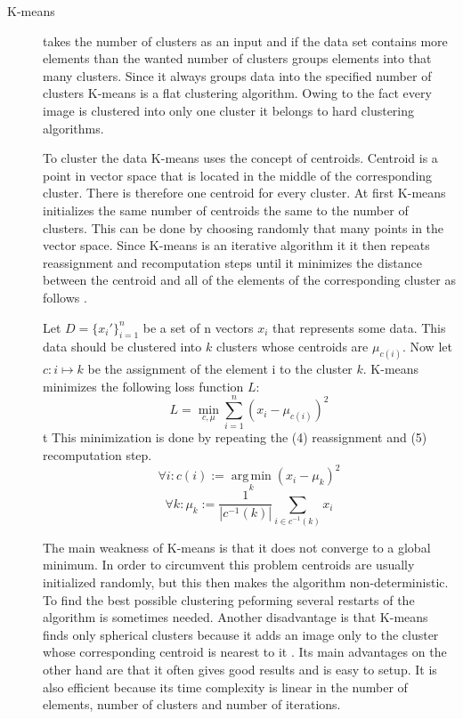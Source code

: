 \documentclass[journal]{vgtc}       %
\begin{document}
\begin{description}
\item [K-means] takes the number of clusters as an input and if the data set contains more elements than the wanted number of clusters groups elements into that many clusters. Since it always groups data into the specified number of clusters K-means is a flat clustering algorithm. Owing to the fact every image is clustered into only one cluster it belongs to hard clustering algorithms. 

To cluster the data K-means uses the concept of centroids. Centroid is a point in vector space that is located in the middle of the corresponding cluster. There is therefore one centroid for every cluster. 
At first K-means initializes the same number of centroids the same to the number of clusters. This can be done by choosing randomly that many points in the vector space. Since K-means is an iterative algorithm it  it then repeats reassignment and recomputation steps until it minimizes the distance between the centroid and all of the elements of the corresponding cluster as follows \cite{KI17}. 

Let $D = \{x_i'\}_{i=1}^n$ be a set of n vectors $x_i$ that represents some data. This data should be clustered into $k$ clusters whose centroids are  $\mu_{c(i)}$. Now let $c: i \mapsto k$ be the assignment of the element i to the cluster $k$. 
K-means minimizes the following loss function $L$:
\begin{equation}
L = \min_{c, \mu} \sum_{i=1}^{n}(x_i - \mu_{c(i)})^2
\end{equation} t
This minimization is done by repeating the (4) reassignment and (5) recomputation step.
\begin{equation}
\forall i: c(i) := \operatorname*{arg\,min}_k (x_i - \mu_k)^2
\end{equation}
\begin{equation}
\forall k: \mu_k := \frac{1}{|c^{-1}(k)|} \sum_{i \in c^{-1}(k)} x_i
\end{equation}


The main weakness of K-means is that it does not converge to a global minimum. In order to circumvent this problem centroids are usually initialized randomly, but this then makes the algorithm non-deterministic. To find the best possible clustering peforming several restarts of the algorithm is sometimes needed.  Another disadvantage is that K-means finds only spherical clusters because it adds an image only to the cluster whose corresponding  centroid is nearest to it \cite{jain2010data}. Its main advantages on the other hand are that it often gives good results and is easy to setup. It is also efficient because its time complexity is linear in the number of elements, number of clusters and number of iterations. 


\end{description}
\end{document}
